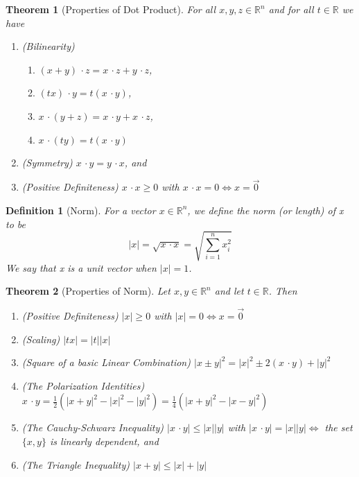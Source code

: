 \documentclass[11pt, oneside]{book}
\theoremstyle{break}
\newtheorem{thm}{Theorem}[section]
\newtheorem{defn}{Definition}[section]
\newcommand{\bb}[1]{\mathbb{#1}}		%
\newcommand{\dotp}{\, \cdotp}	%
\begin{document}
\begin{thm}[Properties of Dot Product]
	For all $x, y, z \in \bb{R}^n$ and for all $t \in \bb{R}$ we have
	\begin{enumerate}
		\item (Bilinearity) 
			\begin{enumerate}
				\item $(x + y) \dotp z = x \dotp z + y \dotp z$,
				\item $(tx) \dotp y = t (x \dotp y)$,
				\item $x \dotp (y + z) = x \dotp y + x \dotp z$,
				\item $x \dotp (ty) = t (x \dotp y)$
			\end{enumerate}
		\item (Symmetry) $x \dotp y = y \dotp x$, and
		\item (Positive Definiteness) $x \dotp x \geq 0$ with $x \dotp x = 0 \iff x = \vec{0}$
	\end{enumerate}
\end{thm}

\begin{defn}[Norm]
	For a vector $x \in \bb{R}^n$, we define the norm (or length) of x to be
	\begin{equation*}
		|x| = \sqrt{x \dotp x} = \sqrt{\sum_{i=1}^{n} x_i^2}
	\end{equation*}
	We say that x is a unit vector when $|x| = 1$.
\end{defn}

\begin{thm}[Properties of Norm]
	Let $x, y \in \bb{R}^n$ and let $t \in \bb{R}$. Then
	\begin{enumerate}
		\item (Positive Definiteness) $|x| \geq 0$ with $|x| = 0 \iff x = \vec{0}$
		\item (Scaling) $|tx| = |t||x|$
		\item (Square of a basic Linear Combination) $|x \pm y|^2 = |x|^2 \pm 2(x \dotp y) + |y|^2$
		\item (The Polarization Identities) $x \dotp y = \frac{1}{2} (|x + y|^2 - |x|^2 - |y|^2) = \frac{1}{4} (|x + y|^2 - |x - y|^2)$
		\item (The Cauchy-Schwarz Inequality) $|x \dotp y| \leq |x||y|$ with $|x \dotp y| = |x||y| \iff $ the set $\{x, y\}$ is linearly dependent, and
		\item (The Triangle Inequality) $|x + y| \leq |x| + |y|$
	\end{enumerate}
\end{thm}
\end{document}
